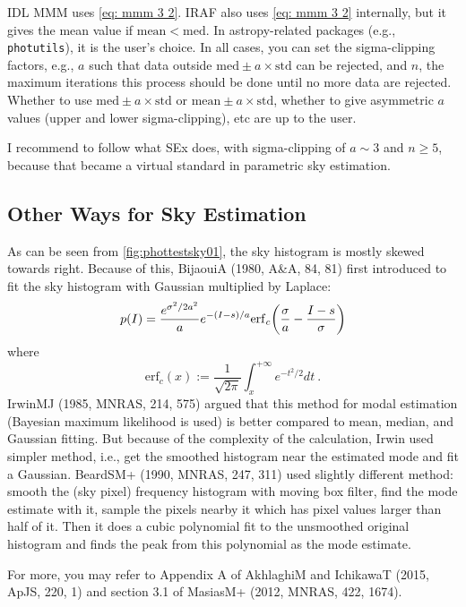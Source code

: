 IDL MMM uses \cref{eq: mmm 3 2}. IRAF also uses \cref{eq: mmm 3 2} internally, but it gives the mean value if $ \mathrm{mean} < \mathrm{med} $. In astropy-related packages (e.g., \texttt{photutils}), it is the user's choice. In all cases, you can set the sigma-clipping factors, e.g., $ a $ such that data outside $ \mathrm{med} \pm a \times \mathrm{std} $ can be rejected, and $ n $, the maximum iterations this process should be done until no more data are rejected. Whether to use $ \mathrm{med} \pm a \times \mathrm{std} $ or $ \mathrm{mean} \pm a \times \mathrm{std} $, whether to give asymmetric $ a $ values (upper and lower sigma-clipping), etc are up to the user.

I recommend to follow what SEx does, with sigma-clipping of $ a \sim 3 $ and $ n \ge 5 $, because that became a virtual standard in parametric sky estimation.


\subsection{Other Ways for Sky Estimation}
As can be seen from \cref{fig:phottestsky01}, the sky histogram is mostly skewed towards right. Because of this, BijaouiA (1980, A\&A, 84, 81) first introduced to fit the sky histogram with Gaussian multiplied by Laplace:
\begin{equation}
  p(I) = \frac{e^{\sigma^2 / 2 a^2}}{a} e^{-(I - s) / a} \mathrm{erf}_c \qty(\frac{\sigma}{a} - \frac{I - s}{\sigma})
\end{equation}
where
\begin{equation} 
  \mathrm{erf}_c(x) := \frac{1}{\sqrt{2\pi}} \int_x^{+\infty} e^{-t^2/2} dt ~.
\end{equation}
IrwinMJ (1985, MNRAS, 214, 575) argued that this method for modal estimation (Bayesian maximum likelihood is used) is better compared to mean, median, and Gaussian fitting. But because of the complexity of the calculation, Irwin used simpler method, i.e., get the smoothed histogram near the estimated mode and fit a Gaussian. BeardSM+ (1990, MNRAS, 247, 311) used slightly different method: smooth the (sky pixel) frequency histogram with moving box filter, find the mode estimate with it, sample the pixels nearby it which has pixel values larger than half of it. Then it does a cubic polynomial fit to the unsmoothed original histogram and finds the peak from this polynomial as the mode estimate.

For more, you may refer to Appendix A of AkhlaghiM and IchikawaT (2015, ApJS, 220, 1) and section 3.1 of MasiasM+ (2012, MNRAS, 422, 1674). 



